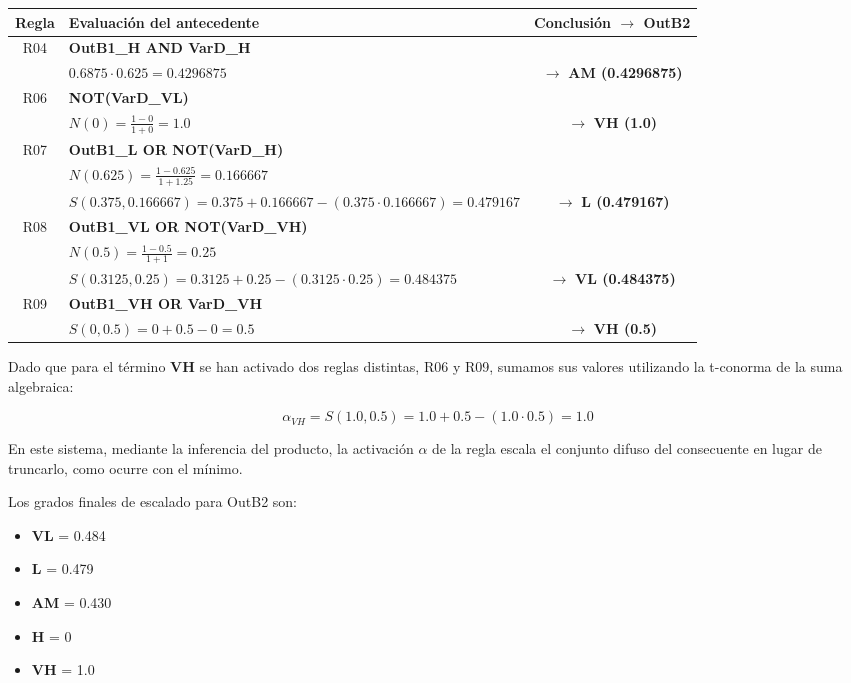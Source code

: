 \documentclass[11pt, a4paper]{article}
\newenvironment{problem}[1][Cuestión]{
	\vspace{0.5cm}
	\noindent{\Large\bfseries #1} \par\vspace{0.5cm}
}{
	\vspace{0.5cm}
}
\begin{document}
\begin{problem}[Problema 2 (60 \%)]
{				\begin{table}[H]
					\centering
					\color{blue}
					\begin{tabular}{clc}
						\toprule
						\textbf{Regla} & \textbf{Evaluación del antecedente} & \textbf{Conclusión $\rightarrow$ OutB2} \\
						\midrule
						R04 & \textbf{OutB1\_H AND VarD\_H} \\
							& $0.6875 \cdot 0.625 = 0.4296875$ & $\rightarrow$ \textbf{AM (0.4296875)} \\
						\midrule
						R06 & \textbf{NOT(VarD\_VL)} \\
							& $N(0) = \frac{1-0}{1+0} = 1.0$ & $\rightarrow$ \textbf{VH (1.0)} \\
						\midrule
						R07 & \textbf{OutB1\_L OR NOT(VarD\_H)} \\
							& $N(0.625) = \frac{1-0.625}{1+1.25} = 0.166667$ \\
							& $S(0.375, 0.166667) = 0.375 + 0.166667 - (0.375 \cdot 0.166667) = 0.479167$ & $\rightarrow$ \textbf{L (0.479167)} \\
						\midrule
						R08 & \textbf{OutB1\_VL OR NOT(VarD\_VH)} \\
							& $N(0.5) = \frac{1-0.5}{1+1} = 0.25$ \\
							& $S(0.3125, 0.25) = 0.3125 + 0.25 - (0.3125 \cdot 0.25) = 0.484375$ & $\rightarrow$ \textbf{VL (0.484375)} \\
						\midrule
						R09 & \textbf{OutB1\_VH OR VarD\_VH} \\
							& $S(0, 0.5) = 0 + 0.5 - 0 = 0.5$ & $\rightarrow$ \textbf{VH (0.5)} \\
						\bottomrule
					\end{tabular}
				\end{table}

				Dado que para el término \textbf{VH} se han activado dos reglas distintas, R06 y R09, sumamos sus valores utilizando la t-conorma de la suma algebraica:

				\[
				\alpha_{VH} = S(1.0, 0.5) = 1.0 + 0.5 - (1.0 \cdot 0.5) = 1.0
				\]

				En este sistema, mediante la inferencia del producto, la activación $\alpha$ de la regla escala el conjunto difuso del consecuente en lugar de truncarlo, como ocurre con el mínimo. 

				Los grados finales de escalado para OutB2 son: 

				\begin{itemize}
					\item \textbf{VL} = 0.484
					\item \textbf{L} = 0.479
					\item \textbf{AM} = 0.430
					\item \textbf{H} = 0
					\item \textbf{VH} = 1.0
				\end{itemize}

}
\end{problem}
\end{document}
